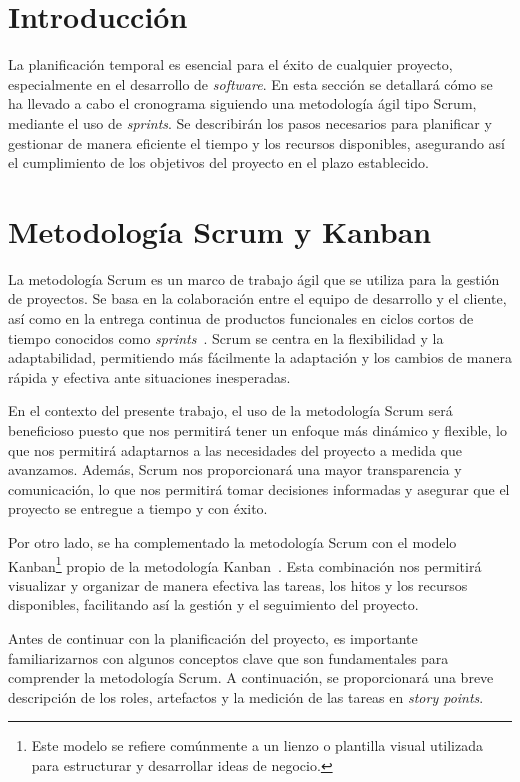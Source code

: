 

\section{Introducción}

La planificación temporal es esencial para el éxito de cualquier proyecto, especialmente en el desarrollo de \textit{software}. En esta sección se detallará cómo se ha llevado a cabo el cronograma siguiendo una metodología ágil tipo Scrum, mediante el uso de \textit{sprints}. Se describirán los pasos necesarios para planificar y gestionar de manera eficiente el tiempo y los recursos disponibles, asegurando así el cumplimiento de los objetivos del proyecto en el plazo establecido.

\section{Metodología Scrum y Kanban}
La metodología Scrum es un marco de trabajo ágil que se utiliza para la gestión de proyectos. Se basa en la colaboración entre el equipo de desarrollo y el cliente, así como en la entrega continua de productos funcionales en ciclos cortos de tiempo conocidos como \textit{sprints}~\cite{Palacio2022}. Scrum se centra en la flexibilidad y la adaptabilidad, permitiendo más fácilmente la adaptación y los cambios de manera rápida y efectiva ante situaciones inesperadas. 

En el contexto del presente trabajo, el uso de la metodología Scrum será beneficioso puesto que nos permitirá tener un enfoque más dinámico y flexible, lo que nos permitirá adaptarnos a las necesidades del proyecto a medida que avanzamos. Además, Scrum nos proporcionará una mayor transparencia y comunicación, lo que nos permitirá tomar decisiones informadas y asegurar que el proyecto se entregue a tiempo y con éxito.

Por otro lado, se ha complementado la metodología Scrum con el modelo Kanban\footnote{Este modelo se refiere comúnmente a un lienzo o plantilla visual utilizada para estructurar y desarrollar ideas de negocio.} propio de la metodología Kanban~\cite{Martins_2022}. Esta combinación nos permitirá visualizar y organizar de manera efectiva las tareas, los hitos y los recursos disponibles, facilitando así la gestión y el seguimiento del proyecto.

Antes de continuar con la planificación del proyecto, es importante familiarizarnos con algunos conceptos clave que son fundamentales para comprender la metodología Scrum. A continuación, se proporcionará una breve descripción de los roles, artefactos y la medición de las tareas en \textit{story points}.

